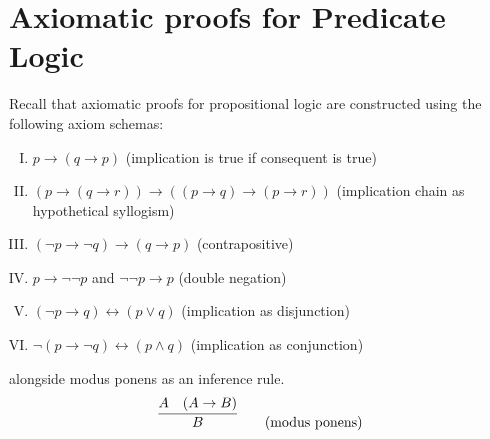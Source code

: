 \section{Axiomatic proofs for Predicate Logic}

Recall that axiomatic proofs for propositional logic are constructed using the following axiom schemas:
%
\begin{enumerate}[I.]
    \item \(p \rightarrow (q \rightarrow p)\)
    \hfill (implication is true if consequent is true)
    \label{Ch06-axiom-I}
    
    \item \((p \rightarrow (q \rightarrow r)) \rightarrow ((p \rightarrow q) \rightarrow (p \rightarrow r))\)
    \hfill (implication chain as hypothetical syllogism)
    \label{Ch06-axiom-II}
    
    \item \((\neg p \rightarrow \neg q) \rightarrow (q \rightarrow p)\)
    \hfill (contrapositive)
    \label{Ch06-axiom-III}

    \item \(p \rightarrow \neg\neg p\) and \(\neg\neg p \rightarrow p\)
    \hfill (double negation)
    \label{Ch06-axiom-IV}
    
    \item \((\neg p \rightarrow q) \leftrightarrow (p \lor q)\)
    \hfill (implication as disjunction)
    \label{Ch06-axiom-V}
    
    \item \(\neg(p \rightarrow \neg q) \leftrightarrow (p \land q)\)
    \hfill (implication as conjunction)
    \label{Ch06-axiom-VI}
\end{enumerate}
%
alongside modus ponens as an inference rule.
%
\[
    \infer{B}{
        A
        &
        (A\rightarrow B)
    }
    \tag{modus ponens}
\]

